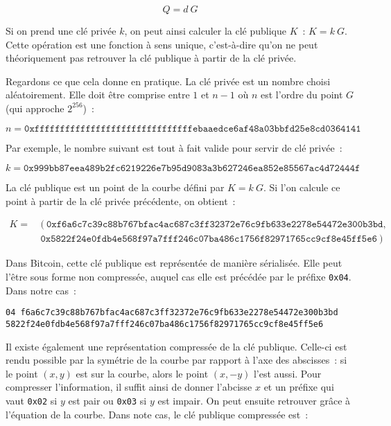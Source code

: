 \[
Q = d~G
\]

Si on prend une clé privée $k$, on peut ainsi calculer la clé publique $K$~: $K = k~G$. Cette opération est une fonction à sens unique, c'est-à-dire qu'on ne peut théoriquement pas retrouver la clé publique à partir de la clé privée. 


Regardons ce que cela donne en pratique. La clé privée est un nombre choisi aléatoirement. Elle doit être comprise entre $1$ et $n - 1$ où $n$ est l'ordre du point $G$ (qui approche $2^{256}$)~: 

{ \footnotesize
\[
n = \mathtt{0xfffffffffffffffffffffffffffffffebaaedce6af48a03bbfd25e8cd0364141}
\]
}

Par exemple, le nombre suivant est tout à fait valide pour servir de clé privée~:

{ \footnotesize
\[
k = \mathtt{0x999bb87eea489b2fc6219226e7b95d9083a3b627246ea852e85567ac4d72444f}
\]
}



La clé publique est un point de la courbe défini par $K = k~G$. Si l'on calcule ce point à partir de la clé privée précédente, on obtient~:

{ \footnotesize
\begin{align*}
K = &~(~\mathtt{0xf6a6c7c39c88b767bfac4ac687c3ff32372e76c9fb633e2278e54472e300b3bd}, \\
    &~\mathtt{0x5822f24e0fdb4e568f97a7fff246c07ba486c1756f82971765cc9cf8e45ff5e6}~)
\end{align*}
}

Dans Bitcoin, cette clé publique est représentée de manière sérialisée. Elle peut l'être sous forme non compressée, auquel cas elle est précédée par le préfixe \verb?0x04?. Dans notre cas~: 

\begin{Verbatim}[fontsize=\footnotesize]
04 f6a6c7c39c88b767bfac4ac687c3ff32372e76c9fb633e2278e54472e300b3bd
5822f24e0fdb4e568f97a7fff246c07ba486c1756f82971765cc9cf8e45ff5e6
\end{Verbatim}

Il existe également une représentation compressée de la clé publique. Celle-ci est rendu possible par la symétrie de la courbe par rapport à l'axe des abscisses~: si le point $(x, y)$ est sur la courbe, alors le point $(x, - y)$ l'est aussi. Pour compresser l'information, il suffit ainsi de donner l'abcisse $x$ et un préfixe qui vaut \verb?0x02? si $y$ est pair ou \verb?0x03? si $y$ est impair. On peut ensuite retrouver grâce à l'équation de la courbe. Dans note cas, le clé publique compressée est~:


